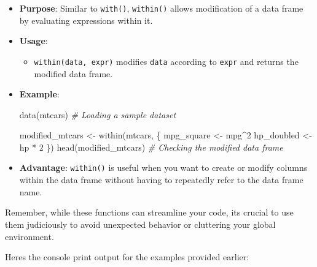 \documentclass[
]{article}
\newenvironment{Shaded}{}{}
\newcommand{\CommentTok}[1]{\textcolor[rgb]{0.38,0.63,0.69}{\textit{#1}}}
\newcommand{\DecValTok}[1]{\textcolor[rgb]{0.25,0.63,0.44}{#1}}
\newcommand{\FunctionTok}[1]{\textcolor[rgb]{0.02,0.16,0.49}{#1}}
\newcommand{\NormalTok}[1]{#1}
\newcommand{\OtherTok}[1]{\textcolor[rgb]{0.00,0.44,0.13}{#1}}
\newcommand{\SpecialCharTok}[1]{\textcolor[rgb]{0.25,0.44,0.63}{#1}}
\begin{document}
\begin{itemize}
\item
  \textbf{Purpose}: Similar to \texttt{with()}, \texttt{within()} allows
  modification of a data frame by evaluating expressions within it.
\item
  \textbf{Usage}:

  \begin{itemize}
  \item
    \texttt{within(data,\ expr)} modifies \texttt{data} according to
    \texttt{expr} and returns the modified data frame.
  \end{itemize}
\item
  \textbf{Example}:

\begin{Shaded}
\begin{Highlighting}[]
\FunctionTok{data}\NormalTok{(mtcars) }\CommentTok{\# Loading a sample dataset}

\NormalTok{modified\_mtcars }\OtherTok{\textless{}{-}} \FunctionTok{within}\NormalTok{(mtcars, \{}
\NormalTok{  mpg\_square }\OtherTok{\textless{}{-}}\NormalTok{ mpg}\SpecialCharTok{\^{}}\DecValTok{2}
\NormalTok{  hp\_doubled }\OtherTok{\textless{}{-}}\NormalTok{ hp }\SpecialCharTok{*} \DecValTok{2}
\NormalTok{  \})}
\FunctionTok{head}\NormalTok{(modified\_mtcars) }\CommentTok{\# Checking the modified data frame}
\end{Highlighting}
\end{Shaded}
\item
  \textbf{Advantage}: \texttt{within()} is useful when you want to
  create or modify columns within the data frame without having to
  repeatedly refer to the data frame name.
\end{itemize}

Remember, while these functions can streamline your code,
it\textquotesingle s crucial to use them judiciously to avoid unexpected
behavior or cluttering your global environment.

Here\textquotesingle s the console print output for the examples
provided earlier:
\end{document}
